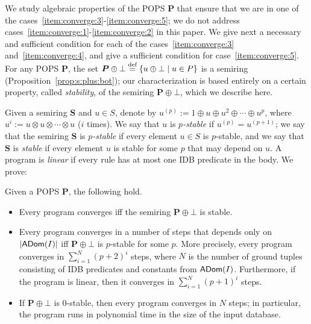 We study algebraic properties of the POPS $\bm P$ that ensure that we
are in one of the cases~\ref{item:converge:3}-\ref{item:converge:5};
we do not address cases~\ref{item:converge:1}-\ref{item:converge:2} in
this paper.  We give next a necessary and sufficient condition for
each of the cases~\ref{item:converge:3} and~\ref{item:converge:4}, and
give a sufficient condition for case~\ref{item:converge:5}.  
For any POPS $\bm P$, the set
$\bm P \oplus \bot \stackrel{\text{def}}{=} \{{u\oplus \bot}\mid{u \in P}\}$ is a
semiring (Proposition~\ref{prop:s:plus:bot}); our characterization is based entirely on a certain
property, called {\em stability}, of the semiring $\bm P \oplus \bot$,
which we describe here.

Given a semiring $\bm S$ and $u \in S$, denote by
$u^{(p)} := 1 \oplus u \oplus u^2 \oplus \cdots \oplus u^{p}$, where
$u^{i} := u \otimes u \otimes \cdots \otimes u$ ($i$ times).  We say
that $u$ is {\em $p$-stable} if $u^{(p)}=u^{(p+1)}$; we say that the
semiring $\bm S$ is {\em $p$-stable} if every element $u \in S$ is $p$-stable, and
we say that $\bm S$ is {\em stable} if every element $u$ is stable for some
$p$ that may depend on $u$.
A \datalogo program is {\em linear} if every rule has at most one IDB predicate in the body.
We prove:

\begin{thm} \label{th:main:intro} Given a POPS $\bm P$, the following hold.
  \begin{itemize}
  \item Every \datalogo program converges iff the semiring $\bm P\oplus \bot$ is stable.
  \item Every program converges in a number of steps that depends only
    on $|\textsf{ADom}(I)|$ iff $\bm P \oplus \bot$ is $p$-stable for some
    $p$.  More precisely, every \datalogo program converges in
    $\sum_{i=1}^{N}(p+2)^i$ steps, where $N$ is the number of ground
    tuples consisting of IDB predicates and constants from $\textsf{ADom}(I)$.
    Furthermore, if the program is linear, then it converges in $\sum_{i=1}^N(p+1)^i$ steps.
  \item If $\bm P\oplus \bot$ is $0$-stable, then every \datalogo
    program converges in $N$ steps; in particular, the program runs in
    polynomial time in the size of the input database.
  \end{itemize}
\end{thm}


